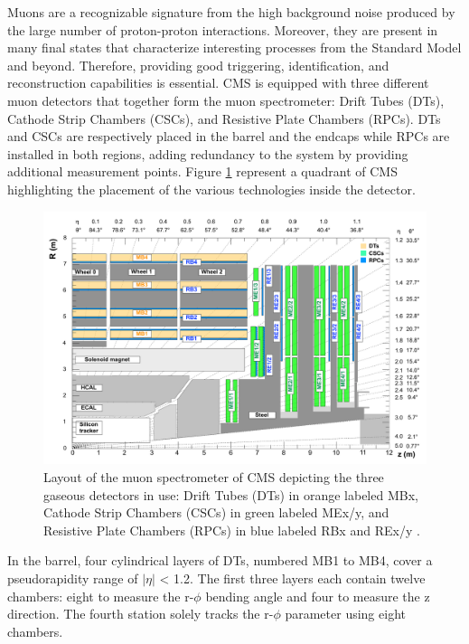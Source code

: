     Muons are a recognizable signature from the high background noise produced by the large number of proton-proton interactions. Moreover, they are present in many final states that characterize interesting processes from the Standard Model and beyond. Therefore, providing good triggering, identification, and reconstruction capabilities is essential. CMS is equipped with three different muon detectors that together form the muon spectrometer: Drift Tubes (DTs), Cathode Strip Chambers (CSCs), and Resistive Plate Chambers (RPCs). DTs and CSCs are respectively placed in the barrel and the endcaps while RPCs are installed in both regions, adding redundancy to the system by providing additional measurement points. Figure \ref{fig:I-3-muons} represent a quadrant of CMS highlighting the placement of the various technologies inside the detector. \\

    \begin{figure}[h!]
      \centering
      \includegraphics[width=\textwidth]{img/I-3-cms/muons.pdf}
      \caption{Layout of the muon spectrometer of CMS depicting the three gaseous detectors in use: Drift Tubes (DTs) in orange labeled MBx, Cathode Strip Chambers (CSCs) in green labeled MEx/y, and Resistive Plate Chambers (RPCs) in blue labeled RBx and REx/y \cite{1748-0221-3-08-S08004}.}
      \label{fig:I-3-muons}
    \end{figure}

    In the barrel, four cylindrical layers of DTs, numbered MB1 to MB4, cover a pseudorapidity range of $ | \eta | $ < 1.2. The first three layers each contain twelve chambers: eight to measure the r-$\phi$ bending angle and four to measure the z direction. The fourth station solely tracks the r-$\phi$ parameter using eight chambers. \\


